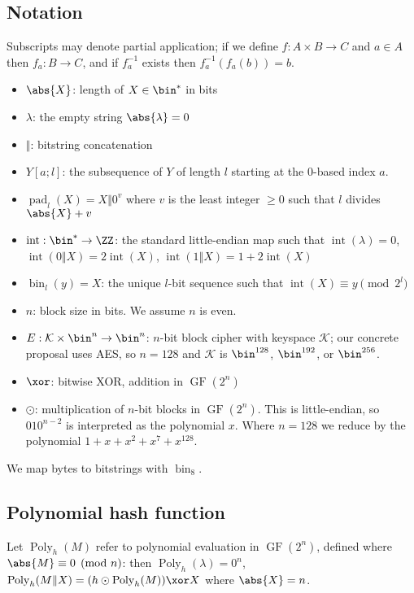 \documentclass[letterpaper,11pt]{article}
\newcommand*{\Concat}{\Vert}
\DeclareMathOperator{\GF}{GF}
\DeclareMathOperator{\fromint}{bin}
\DeclareMathOperator{\intify}{int}
\DeclareMathOperator{\pad}{pad}
\DeclareMathOperator{\Poly}{Poly}
\begin{document}
\subsection{Notation}
Subscripts may denote partial application; if we define $f: A \times B \rightarrow C$ and
$a \in A$ then $f_a: B \rightarrow C$, and if $f_a^{-1}$ exists then $f_a^{-1}(f_a(b)) = b$.
\begin{itemize}
    \item $\abs{X}$: length of $X \in \bin^{*}$ in bits
    \item $\lambda$: the empty string $\abs{\lambda} = 0$
    \item $\Concat$: bitstring concatenation
    \item $Y[a;l]$: the subsequence of $Y$ of length $l$ starting at the 0-based index $a$.
    \item $\pad_l(X) = X \Concat 0^v$
    where $v$ is the least integer $\geq 0$ such that $l$ divides $\abs{X} + v$
    \item $\intify: \bin^{*} \rightarrow \ZZ$: the
    standard little-endian map such that
    $\intify(\lambda) = 0$, $\intify(0 \Concat X) = 2\intify(X)$, $\intify(1 \Concat X) = 1 + 2\intify(X)$
    \item $\fromint_l(y) = X$: the unique
    $l$-bit sequence such that $\intify(X) \equiv y \pmod{2^l}$
    \item \(n\): block size in bits. We assume \(n\) is even.
    \item \(E: \mathcal{K} \times \bin^n \rightarrow \bin^n\): 
    \(n\)-bit block cipher with keyspace \(\mathcal{K}\);
    our concrete proposal uses AES, so \(n=128\) and \(\mathcal{K}\) is
    \(\bin^{128}\), \(\bin^{192}\), or \(\bin^{256}\). 
    \item \(\xor\): bitwise XOR, addition in \(\GF(2^n)\)
    \item \(\odot\): multiplication of \(n\)-bit blocks in \(\GF(2^n)\).
    This is little-endian, so \(010^{n-2}\) is interpreted as the
    polynomial \(x\). Where \(n=128\) we reduce by the polynomial
    \(1 + x + x^2 + x^7 + x^{128}\).
\end{itemize}
We map bytes to bitstrings with \(\fromint_8\).

\subsection{Polynomial hash function}

Let \(\Poly_h(M)\) refer to polynomial evaluation in \(\GF(2^n)\),
defined where \(\abs{M} \equiv 0 \pmod n\): then
\(\Poly_h(\lambda) = 0^n\), \(\Poly_h(M \Concat X) = (h \odot \Poly_h(M)) \xor X\) 
where \(\abs{X} = n\).
\end{document}
